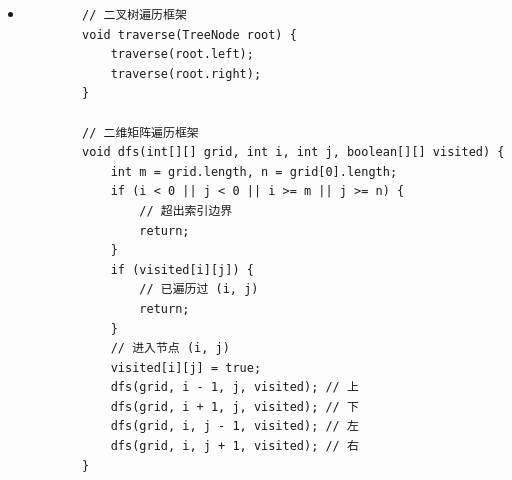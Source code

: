 \documentclass[a4paper,11pt,twoside]{book}
\begin{document}
\begin{itemize}
	3) 排列，  没有start, 用used
	
	\begin{lstlisting}
		List<List<Integer>> res = new LinkedList<>();
		// 记录回溯算法的递归路径
		LinkedList<Integer> track = new LinkedList<>();
		// track 中的元素会被标记为 true
		boolean[] used;
		
		/* 主函数，输入一组不重复的数字，返回它们的全排列 */
		public List<List<Integer>> permute(int[] nums) {
			used = new boolean[nums.length];
			backtrack(nums);
			return res;
		}
		
		// 回溯算法核心函数
		void backtrack(int[] nums) {
			// base case，到达叶子节点
			if (track.size() == nums.length) {
				// 收集叶子节点上的值
				res.add(new LinkedList(track));
				return;
			}
			
			// 回溯算法标准框架
			for (int i = 0; i < nums.length; i++) {
				// 已经存在 track 中的元素，不能重复选择
				if (used[i]) {
					continue;
				}
				// 做选择
				used[i] = true;
				track.addLast(nums[i]);
				// 进入下一层回溯树
				backtrack(nums);
				// 取消选择
				track.removeLast();
				used[i] = false;
			}
		}
	\end{lstlisting}
	
	4) 体现在代码上，需要先进行排序，让相同的元素靠在一起，如果发现 nums[i] == nums[i-1]，则跳过：
	5) 同 2
	6)  if (i > 0 && nums[i] == nums[i - 1] && !used[i - 1]) {
		// 如果前面的相邻相等元素没有用过，则跳过
		continue;
	}
	
	7）// 可重组合的回溯算法框架
	void backtrack(int[] nums, int start) {
		for (int i = start; i < nums.length; i++) {
			// ...
			// 递归遍历下一层回溯树，注意参数
			backtrack(nums, i);
			// ...
		}
	} 这样这棵回溯树会永远生长下去，所以我们的递归函数需要设置合适的 base case 以结束算法，即路径和大于 target 时就没必要再遍历下去了。
	
	8） 同5
	9） 不用used. 
	
	\item 
	\begin{lstlisting}
		// 二叉树遍历框架
		void traverse(TreeNode root) {
			traverse(root.left);
			traverse(root.right);
		}
		
		// 二维矩阵遍历框架
		void dfs(int[][] grid, int i, int j, boolean[][] visited) {
			int m = grid.length, n = grid[0].length;
			if (i < 0 || j < 0 || i >= m || j >= n) {
				// 超出索引边界
				return;
			}
			if (visited[i][j]) {
				// 已遍历过 (i, j)
				return;
			}
			// 进入节点 (i, j)
			visited[i][j] = true;
			dfs(grid, i - 1, j, visited); // 上
			dfs(grid, i + 1, j, visited); // 下
			dfs(grid, i, j - 1, visited); // 左
			dfs(grid, i, j + 1, visited); // 右
		}
	\end{lstlisting}


\end{itemize}
\end{document}
